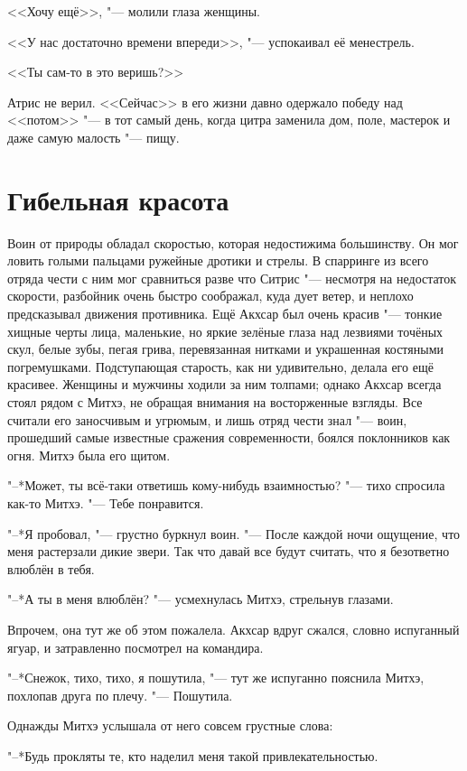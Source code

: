 \documentclass[a4paper,10pt]{book}
\begin{document}
<<Хочу ещё>>, "--- молили глаза женщины.

<<У нас достаточно времени впереди>>, "--- успокаивал её менестрель.

<<Ты сам-то в это веришь?>>

Атрис не верил. <<Сейчас>> в его жизни давно одержало победу над <<потом>> "--- в тот самый день, когда цитра заменила дом, поле, мастерок и даже самую малость "--- пищу.

\section{Гибельная красота}

Воин от природы обладал скоростью, которая недостижима большинству. Он мог ловить голыми пальцами ружейные дротики и стрелы. В спарринге из всего отряда чести с ним мог сравниться разве что Ситрис "--- несмотря на недостаток скорости, разбойник очень быстро соображал, куда дует ветер, и неплохо предсказывал движения противника. Ещё Акхсар был очень красив "--- тонкие хищные черты лица, маленькие, но яркие зелёные глаза над лезвиями точёных скул, белые зубы, пегая грива, перевязанная нитками и украшенная костяными погремушками. Подступающая старость, как ни удивительно, делала его ещё красивее. Женщины и мужчины ходили за ним толпами; однако Акхсар всегда стоял рядом с Митхэ, не обращая внимания на восторженные взгляды. Все считали его заносчивым и угрюмым, и лишь отряд чести знал "--- воин, прошедший самые известные сражения современности, боялся поклонников как огня. Митхэ была его щитом.

"--*Может, ты всё-таки ответишь кому-нибудь взаимностью? "--- тихо спросила как-то Митхэ. "--- Тебе понравится.

"--*Я пробовал, "--- грустно буркнул воин. "--- После каждой ночи ощущение, что меня растерзали дикие звери. Так что давай все будут считать, что я безответно влюблён в тебя.

"--*А ты в меня влюблён? "--- усмехнулась Митхэ, стрельнув глазами.

Впрочем, она тут же об этом пожалела. Акхсар вдруг сжался, словно испуганный ягуар, и затравленно посмотрел на командира.

"--*Снежок, тихо, тихо, я пошутила, "--- тут же испуганно пояснила Митхэ, похлопав друга по плечу. "--- Пошутила. 

Однажды Митхэ услышала от него совсем грустные слова:

"--*Будь прокляты те, кто наделил меня такой привлекательностью.
\end{document}
